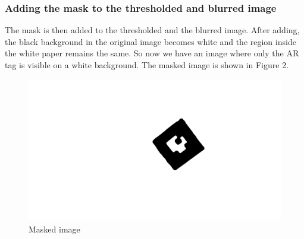 \documentclass[conference]{IEEEtran}
\begin{document}
\subsubsection{Adding the mask to the thresholded and blurred image}
The mask is then added to the thresholded and the blurred image. After adding, the black background in the original image becomes white and the region inside the white paper remains the same. So now we have an image where only the AR tag is visible on a white background. The masked image is shown in Figure 2.
\begin{figure}[H]
\includegraphics[scale=0.08]{./Images/masked_image.png}
\centering
\caption{Masked image}
\end{figure}
\end{document}
